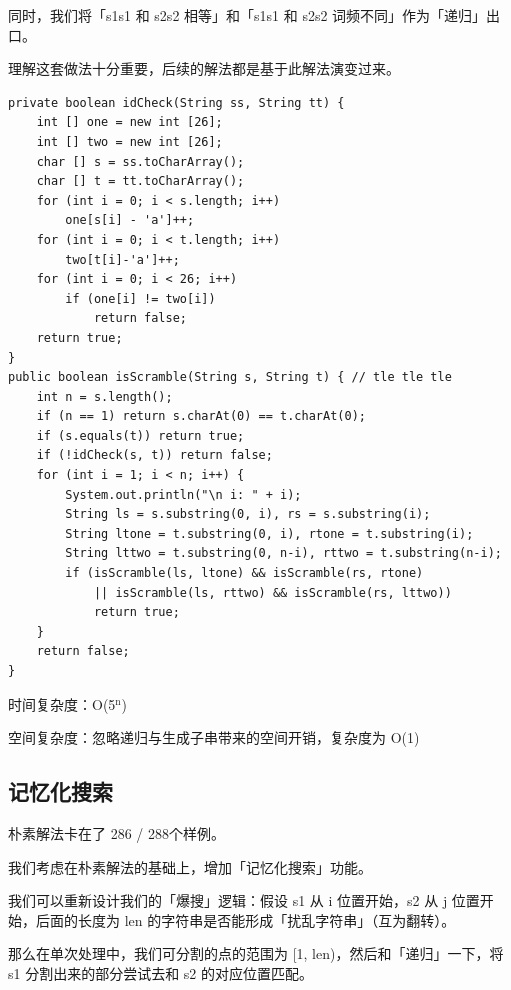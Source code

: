 \documentclass[9pt, b5paaper]{book}
\begin{document}
同时，我们将「s1s1 和 s2s2 相等」和「s1s1 和 s2s2 词频不同」作为「递归」出口。

理解这套做法十分重要，后续的解法都是基于此解法演变过来。
\begin{verbatim}
private boolean idCheck(String ss, String tt) {
    int [] one = new int [26];
    int [] two = new int [26];
    char [] s = ss.toCharArray();
    char [] t = tt.toCharArray();
    for (int i = 0; i < s.length; i++) 
        one[s[i] - 'a']++;
    for (int i = 0; i < t.length; i++) 
        two[t[i]-'a']++;
    for (int i = 0; i < 26; i++) 
        if (one[i] != two[i])
            return false;
    return true;
}
public boolean isScramble(String s, String t) { // tle tle tle
    int n = s.length();
    if (n == 1) return s.charAt(0) == t.charAt(0);
    if (s.equals(t)) return true;
    if (!idCheck(s, t)) return false;
    for (int i = 1; i < n; i++) {
        System.out.println("\n i: " + i);
        String ls = s.substring(0, i), rs = s.substring(i);
        String ltone = t.substring(0, i), rtone = t.substring(i);
        String lttwo = t.substring(0, n-i), rttwo = t.substring(n-i);
        if (isScramble(ls, ltone) && isScramble(rs, rtone)
            || isScramble(ls, rttwo) && isScramble(rs, lttwo))
            return true;
    }
    return false;
}
\end{verbatim}

时间复杂度：O(5$^{\text{n}}$)

空间复杂度：忽略递归与生成子串带来的空间开销，复杂度为 O(1)

\subsection{记忆化搜索}
\label{sec-15-2-2}
朴素解法卡在了 286 / 288个样例。

我们考虑在朴素解法的基础上，增加「记忆化搜索」功能。

我们可以重新设计我们的「爆搜」逻辑：假设 s1 从 i 位置开始，s2 从 j 位置开始，后面的长度为 len 的字符串是否能形成「扰乱字符串」（互为翻转）。

那么在单次处理中，我们可分割的点的范围为 [1, len)，然后和「递归」一下，将 s1 分割出来的部分尝试去和 s2 的对应位置匹配。
\end{document}
